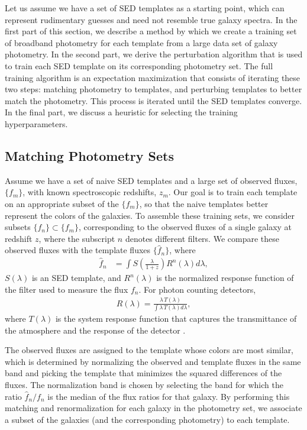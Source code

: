 \documentclass[twocolumn]{aastex63}
\begin{document}
    Let us assume we have a set of SED templates as a starting point, which can represent rudimentary guesses and need not resemble true galaxy spectra. 
    In the first part of this section, we describe a method by which we create a training set of broadband photometry for each template from a large data set of galaxy photometry. 
    In the second part, we derive the perturbation algorithm that is used to train each SED template on its corresponding photometry set. 
    The full training algorithm is an expectation maximization that consists of iterating these two steps: matching photometry to templates, and perturbing templates to better match the photometry.
    This process is iterated until the SED templates converge. 
    In the final part, we discuss a heuristic for selecting the training hyperparameters.




    \subsection{Matching Photometry Sets}
    \label{sect:training_sets}
            
    Assume we have a set of naive SED templates and a large set of observed fluxes, $\{f_m\}$, with known spectroscopic redshifts, $z_m$. 
    Our goal is to train each template on an appropriate subset of the $\{f_m\}$, so that the naive templates better represent the colors of the galaxies. 
    To assemble these training sets, we consider subsets $\{f_n\} \subset \{f_m\}$, corresponding to the observed fluxes of a single galaxy at redshift $z$, where the subscript $n$ denotes different filters. 
    We compare these observed fluxes with the template fluxes $\{\hat{f}_n\}$, where
    \begin{align}
        \hat{f}_n &= \int S\left(\frac{\lambda}{1+z}\right) R^n(\lambda) d\lambda, \label{eq:calc_flux1}
    \end{align}
    $S(\lambda)$ is an SED template, and $R^n(\lambda)$ is the normalized response function of the filter used to measure the flux $f_n$.
    For photon counting detectors,
    \begin{align}
        R(\lambda) = \frac{\lambda \, T(\lambda)}{\int \lambda \, T(\lambda) d\lambda},
    \end{align}
    where $T(\lambda)$ is the system response function that captures the transmittance of the atmosphere and the response of the detector \citep{Bessell2005}.

    The observed fluxes are assigned to the template whose colors are most similar, which is determined by normalizing the observed and template fluxes in the same band and picking the template that minimizes the squared differences of the fluxes. 
    The normalization band is chosen by selecting the band for which the ratio $\hat{f}_n / f_n$ is the median of the flux ratios for that galaxy. 
    By performing this matching and renormalization for each galaxy in the photometry set, we associate a subset of the galaxies (and the corresponding photometry) to each template.
\end{document}
